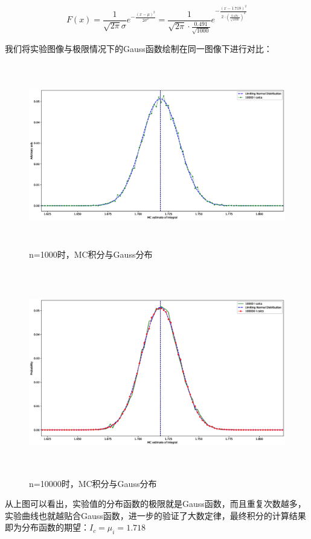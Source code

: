 \documentclass[12pt,a4paper]{article}%
\begin{document}
\[F(x)=\frac{1}{\sqrt{2\pi}\sigma}e^{-\frac{(x-\mu)^2}{2\sigma^2}}=\frac{1}{\sqrt{2\pi}\cdot \frac{0.491}{\sqrt{1000}}}e^{-\frac{(x-1.718)^2}{2\cdot (\frac{0.491}{\sqrt{1000}})^2}}\]

我们将实验图像与极限情况下的Gauss函数绘制在同一图像下进行对比：

\begin{figure}[htbp]
    \centering
    \includegraphics[height=8cm]{P1_1.eps}
    \caption{n=1000时，MC积分与Gauss分布}
\end{figure}

\begin{figure}[htbp]
    \centering
    \includegraphics[height=9cm]{P1_2.eps}
    \caption{n=10000时，MC积分与Gauss分布}
\end{figure}

从上图可以看出，实验值的分布函数的极限就是Gauss函数，而且重复次数越多，实验曲线也就越贴合Gauss函数，进一步的验证了大数定律，最终积分的计算结果即为分布函数的期望：$I_c=\mu_i=1.718$
\end{document}
